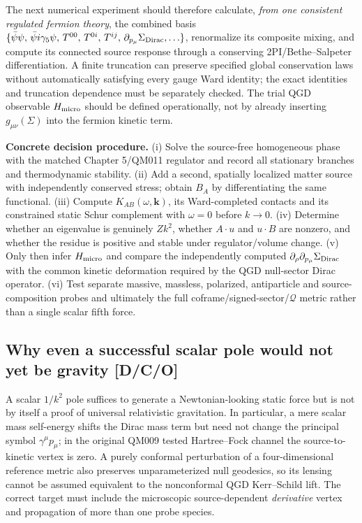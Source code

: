 \documentclass[11pt,a4paper]{article}
\begin{document}
The next numerical experiment should therefore calculate, \emph{from one consistent regulated fermion theory}, the combined basis $\{\bar\psi\psi,\,\bar\psi i\gamma_5\psi,\,T^{00},\,T^{0i},\,T^{ij},\,\partial_{p_\mu}\Sigma_{\rm Dirac},\ldots\}$, renormalize its composite mixing, and compute its connected source response through a conserving 2PI/Bethe--Salpeter differentiation. A finite truncation can preserve specified global conservation laws without automatically satisfying every gauge Ward identity; the exact identities and truncation dependence must be separately checked. The trial QGD observable $H_{\rm micro}$ should be defined operationally, not by already inserting $g_{\mu\nu}(\Sigma)$ into the fermion kinetic term.

\textbf{Concrete decision procedure.} (i) Solve the source-free homogeneous phase with the matched Chapter 5/QM011 regulator and record all stationary branches and thermodynamic stability. (ii) Add a second, spatially localized matter source with independently conserved stress; obtain $B_A$ by differentiating the same functional. (iii) Compute $K_{AB}(\omega,\bm k)$, its Ward-completed contacts and its constrained static Schur complement with $\omega=0$ before $k\to0$. (iv) Determine whether an eigenvalue is genuinely $Zk^2$, whether $A\cdot u$ and $u\cdot B$ are nonzero, and whether the residue is positive and stable under regulator/volume change. (v) Only then infer $H_{\rm micro}$ and compare the independently computed $\partial_{\rho} \partial_{p_\mu}\Sigma_{\rm Dirac}$ with the common kinetic deformation required by the QGD null-sector Dirac operator. (vi) Test separate massive, massless, polarized, antiparticle and source-composition probes and ultimately the full coframe/signed-sector/$\mathcal Q$ metric rather than a single scalar fifth force.

\subsection{Why even a successful scalar pole would not yet be gravity [D/C/O]}\label{sec:v09-universality}
A scalar $1/k^2$ pole suffices to generate a Newtonian-looking static force but is not by itself a proof of universal relativistic gravitation. In particular, a mere scalar mass self-energy shifts the Dirac mass term but need not change the principal symbol $\gamma^\mu p_\mu$; in the original QM009 tested Hartree--Fock channel the source-to-kinetic vertex is zero. A purely conformal perturbation of a four-dimensional reference metric also preserves unparameterized null geodesics, so its lensing cannot be assumed equivalent to the nonconformal QGD Kerr--Schild lift. The correct target must include the microscopic source-dependent \emph{derivative} vertex and propagation of more than one probe species.
\end{document}
